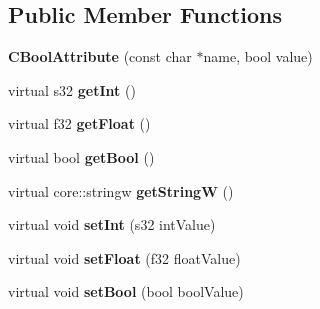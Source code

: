 \subsection*{Public Member Functions}
\begin{DoxyCompactItemize}
\item 
\hypertarget{classirr_1_1io_1_1_c_bool_attribute_a303a00ca1c8293359665548f5306fc4b}{{\bfseries C\-Bool\-Attribute} (const char $\ast$name, bool value)}\label{classirr_1_1io_1_1_c_bool_attribute_a303a00ca1c8293359665548f5306fc4b}

\item 
\hypertarget{classirr_1_1io_1_1_c_bool_attribute_a698ea8db9940d47f6130b483fb52aed8}{virtual s32 {\bfseries get\-Int} ()}\label{classirr_1_1io_1_1_c_bool_attribute_a698ea8db9940d47f6130b483fb52aed8}

\item 
\hypertarget{classirr_1_1io_1_1_c_bool_attribute_a1021b763ca6b3b1dab26344eb033c8a1}{virtual f32 {\bfseries get\-Float} ()}\label{classirr_1_1io_1_1_c_bool_attribute_a1021b763ca6b3b1dab26344eb033c8a1}

\item 
\hypertarget{classirr_1_1io_1_1_c_bool_attribute_a61ffcc589e659091e1f5da2040919664}{virtual bool {\bfseries get\-Bool} ()}\label{classirr_1_1io_1_1_c_bool_attribute_a61ffcc589e659091e1f5da2040919664}

\item 
\hypertarget{classirr_1_1io_1_1_c_bool_attribute_a7d47a74f1da88ed79290d72bfedbb8bb}{virtual core\-::stringw {\bfseries get\-String\-W} ()}\label{classirr_1_1io_1_1_c_bool_attribute_a7d47a74f1da88ed79290d72bfedbb8bb}

\item 
\hypertarget{classirr_1_1io_1_1_c_bool_attribute_a78e1adfd19a58858300d96af191d094c}{virtual void {\bfseries set\-Int} (s32 int\-Value)}\label{classirr_1_1io_1_1_c_bool_attribute_a78e1adfd19a58858300d96af191d094c}

\item 
\hypertarget{classirr_1_1io_1_1_c_bool_attribute_a24a2b5e193e28219bcfbc95832a82646}{virtual void {\bfseries set\-Float} (f32 float\-Value)}\label{classirr_1_1io_1_1_c_bool_attribute_a24a2b5e193e28219bcfbc95832a82646}

\item 
\hypertarget{classirr_1_1io_1_1_c_bool_attribute_a328728ec46c1acb948344df577c679c6}{virtual void {\bfseries set\-Bool} (bool bool\-Value)}\label{classirr_1_1io_1_1_c_bool_attribute_a328728ec46c1acb948344df577c679c6}


\end{DoxyCompactItemize}
